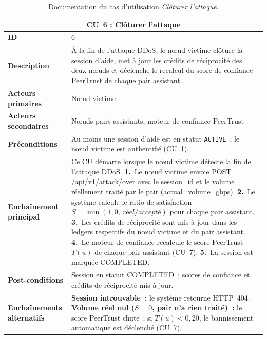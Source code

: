\begin{table}[H]
\centering
\renewcommand{\arraystretch}{1.5}
\begin{tabular}{|p{3.5cm}|p{10.5cm}|}
\hline
\multicolumn{2}{|c|}{\textbf{CU~6 : Clôturer l'attaque}} \\
\hline
\textbf{ID} & 6 \\
\hline
\textbf{Description} & À la fin de l'attaque DDoS, le nœud victime clôture la session d'aide, met à jour les crédits de réciprocité des deux nœuds et déclenche le recalcul du score de confiance PeerTrust de chaque pair assistant. \\
\hline
\textbf{Acteurs primaires} & Nœud victime \\
\hline
\textbf{Acteurs secondaires} & Nœuds pairs assistants, moteur de confiance PeerTrust \\
\hline
\textbf{Préconditions} & Au moins une session d'aide est en statut \texttt{ACTIVE}~;
le nœud victime est authentifié (CU~1). \\

\hline
\textbf{Enchaînement principal} &
Ce CU démarre lorsque le nœud victime détecte la fin de l'attaque DDoS.\newline
\textbf{1.}\ Le nœud victime envoie {POST /api/v1/attack/over} avec le {session\_id} et le volume réellement traité par le pair ({actual\_volume\_gbps}).\newline
\textbf{2.}\ Le système calcule le ratio de satisfaction $S = \min(1{,}0,\ \textit{réel} / \textit{accepté})$ pour chaque pair assistant.\newline
\textbf{3.}\ Les crédits de réciprocité sont mis à jour dans les ledgers respectifs du nœud victime et du pair assistant.\newline
\textbf{4.}\ Le moteur de confiance recalcule le score PeerTrust $T(u)$ de chaque pair assistant (CU~7).\newline
\textbf{5.}\ La session est marquée {COMPLETED}. \\
\hline
\textbf{Post-conditions} & Session en statut {COMPLETED}~; scores de confiance et crédits de réciprocité mis à jour. \\
\hline
\textbf{Enchaînements alternatifs} &
\textbf{Session introuvable~:} le système retourne HTTP~404.\newline
\textbf{Volume réel nul ($S = 0$, pair n'a rien traité)~:} le score PeerTrust chute~; si $T(u) < 0{,}20$, le bannissement automatique est déclenché (CU~7). \\
\hline
\end{tabular}



\caption{Documentation du cas d'utilisation \textit{Clôturer l'attaque}.}
\label{tab:cu6}
\end{table}

